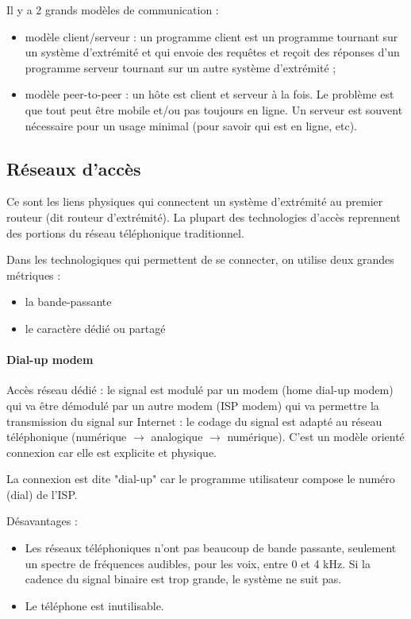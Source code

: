 Il y a 2 grands modèles de communication :

\begin{itemize}
	\item modèle client/serveur : un programme client est un programme tournant sur un système d'extrémité et qui envoie des requêtes et reçoit des réponses d'un programme serveur tournant sur un autre système d'extrémité ;
	\item modèle peer-to-peer : un hôte est client et serveur à la fois. Le problème est que tout peut être mobile et/ou pas toujours en ligne. Un serveur est souvent nécessaire pour un usage minimal (pour savoir qui est en ligne, etc).
\end{itemize}

	\subsection{Réseaux d'accès}
	
	Ce sont les liens physiques qui connectent un système d'extrémité au premier routeur (dit routeur d'extrémité). La plupart des technologies d'accès reprennent des portions du réseau téléphonique traditionnel.

Dans les technologiques qui permettent de se connecter, on utilise deux grandes métriques :

\begin{itemize}
	\item la bande-passante
	\item le caractère dédié ou partagé
\end{itemize}


\paragraph{Dial-up modem}

Accès réseau dédié : le signal est modulé par un modem (home dial-up modem) qui va être démodulé par un autre  modem (ISP modem) qui va permettre la transmission du signal sur Internet : le codage du signal est adapté au réseau téléphonique (numérique $\rightarrow$ analogique $\rightarrow$ numérique). C'est un modèle orienté connexion car elle est explicite et physique.

La connexion est dite "dial-up" car le programme utilisateur compose le numéro (dial) de l'ISP.


Désavantages :

\begin{itemize}
	\item Les réseaux téléphoniques n'ont pas beaucoup de bande passante, seulement un spectre de fréquences audibles, pour les voix, entre 0 et 4 kHz. Si la cadence du signal binaire est trop grande, le système ne suit pas.
	\item Le téléphone est inutilisable.
\end{itemize}	

